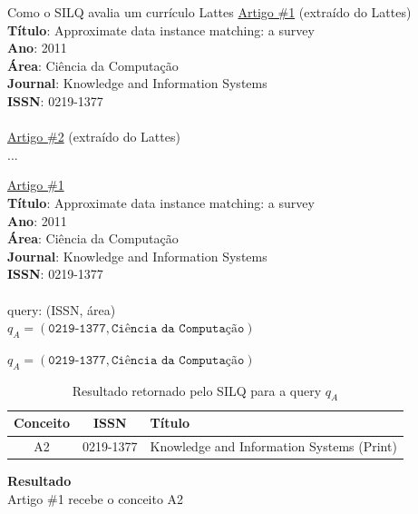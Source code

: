 \documentclass{beamer}
\begin{document}
\begin{frame}{Como o SILQ avalia um currículo Lattes}
  \underline{Artigo \#1} (extraído do Lattes)\\
  \textbf{Título}: Approximate data instance matching: a survey\\
  \textbf{Ano}: 2011\\
  \textbf{Área}: Ciência da Computação\\
  \textbf{Journal}: Knowledge and Information Systems\\
  \textbf{ISSN}: 0219-1377\\

  \hfill \\
  \underline{Artigo \#2} (extraído do Lattes)\\
  ...
\end{frame}

\begin{frame}
  \underline{Artigo \#1}\\
  \textbf{Título}: Approximate data instance matching: a survey\\
  \textbf{Ano}: 2011\\
  \textbf{Área}: Ciência da Computação\\
  \textbf{Journal}: Knowledge and Information Systems\\
  \textbf{ISSN}: 0219-1377\\

  \hfill \\
  query: (ISSN, área)\\
  $q_A = (\texttt{0219-1377}, \texttt{Ciência da Computação})$
\end{frame}

\begin{frame}
  $q_A = (\texttt{0219-1377}, \texttt{Ciência da Computação})$

  \pause
  \small
  \begin{table}
    \begin{tabular}{ c | c | p{7cm} }
      \textbf{Conceito} & \textbf{ISSN} & \textbf{Título}\\
      \hline \hline

      A2 & 0219-1377 & Knowledge and Information Systems (Print)\\
    \end{tabular}
    \caption{Resultado retornado pelo SILQ para a query $q_A$}
  \end{table}

  \pause
  \normalsize
  \textbf{Resultado}\\
  Artigo \#1 recebe o conceito A2
\end{frame}
\end{document}
